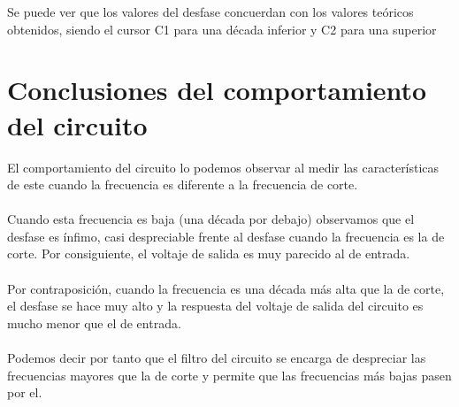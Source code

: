 \documentclass[11pt,letterpaper]{article}
\begin{document}
Se puede ver que los valores del desfase concuerdan con los valores teóricos obtenidos, siendo el cursor C1 para una década inferior y C2 para una superior

\section{Conclusiones del comportamiento del circuito}%
\label{sec:Conclusiones del comportamiento del circuito}
El comportamiento del circuito lo podemos observar al medir las características de este cuando la frecuencia es diferente a la frecuencia de corte. \\
\\
Cuando esta frecuencia es baja (una década por debajo) observamos que el desfase es ínfimo, casi despreciable frente al desfase cuando la frecuencia es la de corte. Por consiguiente, el voltaje de salida es muy parecido al de entrada.\\
\\
Por contraposición, cuando la frecuencia es una década más alta que la de corte, el desfase se hace muy alto y la respuesta del voltaje de salida del circuito es mucho menor que el de entrada.\\
\\
Podemos decir por tanto que el filtro del circuito se encarga de despreciar las frecuencias mayores que la de corte y permite que las frecuencias más bajas pasen por el. 
\end{document}
